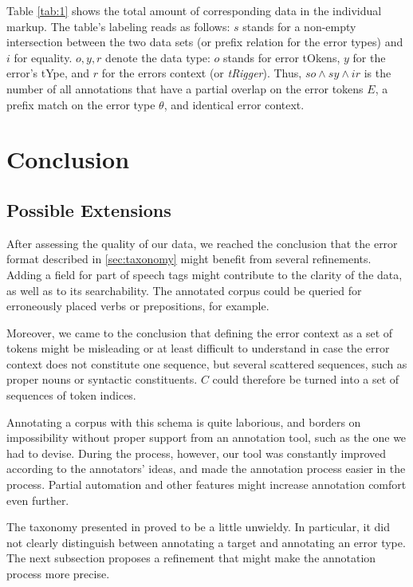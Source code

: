 \documentclass[12pt]{article}
\begin{document}
Table \ref{tab:1} shows the total amount of corresponding data in the individual
markup. The table's labeling reads as follows: $s$ stands for a non-empty
intersection between the two data sets (or prefix relation for the error types)
and $i$ for equality.  $o,y,r$ denote the data type: $o$ stands for error
tOkens, $y$ for the error's tYpe, and $r$ for the errors context (or
\textit{tRigger}). Thus, $so\wedge sy\wedge ir$ is the number of all annotations
that have a partial overlap on the error tokens $E$, a prefix match on the error
type $\theta$, and identical error context.

\section{Conclusion}

\subsection{Possible Extensions}

After assessing the quality of our data, we reached
the conclusion that the error format described in \ref{sec:taxonomy}
might benefit from several refinements. Adding a field for part of speech tags
might contribute to the clarity of the data, as well as to its searchability.
The annotated corpus could be queried for erroneously placed verbs or
prepositions, for example.

Moreover, we came to the conclusion that defining the error context as a set of
tokens might be misleading or at least difficult to understand in case the error
context does not constitute one sequence, but several scattered sequences, such
as proper nouns or syntactic constituents. $C$ could therefore be turned into a
set of sequences of token indices.

Annotating a corpus with this schema is quite laborious, and borders on
impossibility without proper support from an annotation tool, such as the one we
had to devise. During the process, however, our tool was constantly improved
according to the annotators' ideas, and made the annotation process easier in
the process. Partial automation and other features might increase annotation
comfort even further.

The taxonomy presented in \label{taxonomy} proved to be a little unwieldy. In
particular, it did not clearly distinguish between annotating a target and
annotating an error type. The next subsection proposes a refinement that might
make the annotation process more precise.
\end{document}
